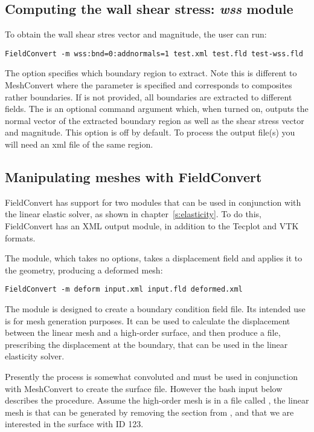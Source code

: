 \subsection{Computing the wall shear stress: \textit{wss} module}
To obtain the wall shear stres vector and magnitude, the user can run:
\begin{lstlisting}[style=BashInputStyle] 
FieldConvert -m wss:bnd=0:addnormals=1 test.xml test.fld test-wss.fld
\end{lstlisting}
The option  specifies which boundary region to extract. Note this is different to MeshConvert where the parameter  is specified and corresponds to composites rather boundaries. If  is not provided, all boundaries are extracted to different fields. The  is an optional command argument which, when turned on, outputs the normal vector of the extracted boundary region as well as the shear stress vector and magnitude. This option is off by default. To process the output file(s) you will need an xml file of the same region. 
%
%
%

\subsection{Manipulating meshes with FieldConvert}
FieldConvert has support for two modules that can be used in conjunction with
the linear elastic solver, as shown in chapter~\ref{s:elasticity}. To do this,
FieldConvert has an XML output module, in addition to the Tecplot and VTK
formats.

The  module, which takes no options, takes a displacement field
and applies it to the geometry, producing a deformed mesh:
\begin{lstlisting}[style=BashInputStyle]
FieldConvert -m deform input.xml input.fld deformed.xml
\end{lstlisting}

The  module is designed to create a boundary condition field
file. Its intended use is for mesh generation purposes. It can be used to
calculate the displacement between the linear mesh and a high-order surface, and
then produce a  file, prescribing the displacement at the boundary,
that can be used in the linear elasticity solver.

Presently the process is somewhat convoluted and must be used in conjunction
with MeshConvert to create the surface file. However the bash input below
describes the procedure. Assume the high-order mesh is in a file called
, the linear mesh is  that can be
generated by removing the  section from , and that
we are interested in the surface with ID 123.

